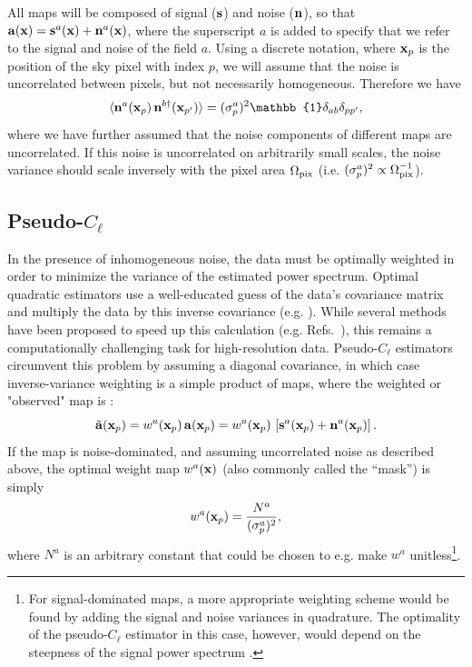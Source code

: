\documentclass[a4paper,11pt]{article}
\begin{document}
    All maps will be composed of signal (${\bf s}$) and noise (${\bf n}$), so that ${\bf a}({\bf x})={\bf s}^a({\bf x})+{\bf n}^a({\bf x})$, where the superscript $a$ is added to specify that we refer to the signal and noise of the field $a$. Using a discrete notation, where ${\bf x}_p$ is the position of the sky pixel with index $p$, we will assume that the noise is uncorrelated between pixels, but not necessarily homogeneous. Therefore we have
      \begin{equation}
        \langle {\bf n}^a({\bf x}_p)\,{\bf n}^{b\dagger}({\bf x}_{p'})\rangle = (\sigma^{a}_p)^2\mathbb{1}\delta_{ab}\delta_{pp'},
      \end{equation}
      where we have further assumed that the noise components of different maps are uncorrelated. If this noise is uncorrelated on arbitrarily small scales, the noise variance should scale inversely with the pixel area $\Omega_{\rm pix}$ (i.e. $(\sigma_p^a)^2\propto \Omega_{\rm pix}^{-1}$).

    \subsection{Pseudo-$C_\ell$}
      In the presence of inhomogeneous noise, the data must be optimally weighted in order to minimize the variance of the estimated power spectrum. Optimal quadratic estimators use a well-educated guess of the data's covariance matrix and multiply the data by this inverse covariance (e.g. \citep{astro-ph/9611174, astro-ph/9708203}). While several methods have been proposed to speed up this calculation (e.g. Refs.~\cite{astro-ph/9805339, astro-ph/0104443, astro-ph/0304513, astro-ph/0209560}), this remains a computationally challenging task for high-resolution data. Pseudo-$C_\ell$ estimators circumvent this problem by assuming a diagonal covariance, in which case inverse-variance weighting is a simple product of maps, where the weighted or "observed" map is \citep{astro-ph/0105302}:
      \begin{equation}
        \tilde{\bf a}({\bf x}_p)=w^a({\bf x}_p)\,{\bf a}({\bf x}_p)=w^a({\bf x}_p)\,\left[{\bf s}^a({\bf x}_p)+{\bf n}^a({\bf x}_p)\right].
      \end{equation}
      If the map is noise-dominated, and assuming uncorrelated noise as described above, the optimal weight map $w^a({\bf x})$ (also commonly called the ``mask'') is simply
      \begin{equation}\label{eq:invar}
        w^a({\bf x}_p) = \frac{N^a}{(\sigma^a_p)^2},
      \end{equation}
      where $N^a$ is an arbitrary constant that could be chosen to e.g. make $w^a$ unitless\footnote{For signal-dominated maps, a more appropriate weighting scheme would be found by adding the signal and noise variances in quadrature. The optimality of the pseudo-$C_\ell$ estimator in this case, however, would depend on the steepness of the signal power spectrum \citep{1306.0005}.
      }.
\end{document}
